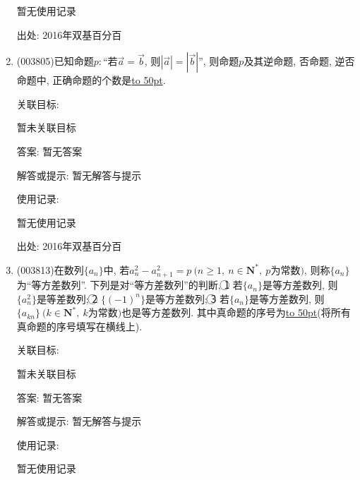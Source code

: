 \documentclass[10pt,a4paper]{article}
\newcommand{\blank}[1]{\underline{\hbox to #1pt{}}}
\begin{document}
\begin{enumerate}[1.]
暂无使用记录


出处: 2016年双基百分百
\item { (003805)}已知命题$p:$``若$\overrightarrow{a}=\overrightarrow{b}$, 则$|\overrightarrow{a}|=|\overrightarrow{b}|$'', 则命题$p$及其逆命题, 否命题, 逆否命题中, 正确命题的个数是\blank{50}.


关联目标:

暂未关联目标

答案: 暂无答案

解答或提示: 暂无解答与提示

使用记录:

暂无使用记录


出处: 2016年双基百分百
\item { (003813)}在数列$\{a_n\}$中, 若$a_n^2-a_{n+1}^2=p\ (n\ge 1, \ n\in\mathbf{N}^*, \ p$为常数$)$, 则称$\{a_n\}$为``等方差数列''. 下列是对``等方差数列''的判断,
\textcircled{1} 若$\{a_n\}$是等方差数列, 则$\{a_n^2\}$是等差数列;
\textcircled{2} $\{(-1)^n\}$是等方差数列;
\textcircled{3} 若$\{a_n\}$是等方差数列, 则$\{a_{kn}\} \ (k\in \mathbf{N}^*, \ k$为常数$)$也是等方差数列.
其中真命题的序号为\blank{50}(将所有真命题的序号填写在横线上).


关联目标:

暂未关联目标

答案: 暂无答案

解答或提示: 暂无解答与提示

使用记录:

暂无使用记录



\end{enumerate}
\end{document}
